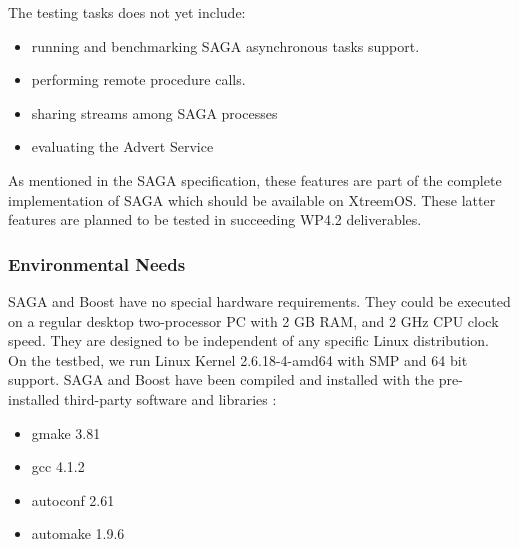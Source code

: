 The testing tasks does not yet include:

\begin{itemize}
 \item running and benchmarking SAGA asynchronous tasks support.
 \item performing remote procedure calls.
 \item sharing streams among SAGA processes
 \item evaluating the Advert Service
\end{itemize}

As mentioned in the SAGA specification, these features are part
of the complete implementation of SAGA which should be available on XtreemOS.
These latter features are planned to be tested in succeeding WP4.2 deliverables.

\subsubsection{Environmental Needs}

\label{api:env}

SAGA and Boost have no special hardware requirements. They could be
executed on a regular desktop two-processor PC with 2 GB RAM, and
2 GHz CPU clock speed.  They are designed to be independent of any
specific Linux distribution. On the testbed, we run Linux Kernel
2.6.18-4-amd64 with SMP and 64 bit support. SAGA and Boost have been
compiled and installed with the pre-installed third-party software and
libraries :
\begin{itemize}
 \item gmake 3.81
 \item gcc 4.1.2
 \item autoconf 2.61
 \item automake 1.9.6
\end{itemize}



